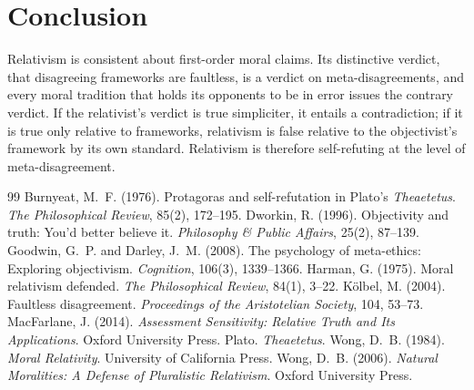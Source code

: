 \documentclass{situationist-preprint}
\begin{document}
\section{Conclusion}

Relativism is consistent about first-order moral claims. Its distinctive verdict, that disagreeing frameworks are faultless, is a verdict on meta-disagreements, and every moral tradition that holds its opponents to be in error issues the contrary verdict. If the relativist's verdict is true simpliciter, it entails a contradiction; if it is true only relative to frameworks, relativism is false relative to the objectivist's framework by its own standard. Relativism is therefore self-refuting at the level of meta-disagreement.

\begin{thebibliography}{99}\small
{} Burnyeat, M.~F. (1976). Protagoras and self-refutation in Plato's \emph{Theaetetus}. \emph{The Philosophical Review}, 85(2), 172--195.
 Dworkin, R. (1996). Objectivity and truth: You'd better believe it. \emph{Philosophy \& Public Affairs}, 25(2), 87--139.
 Goodwin, G.~P. and Darley, J.~M. (2008). The psychology of meta-ethics: Exploring objectivism. \emph{Cognition}, 106(3), 1339--1366.
 Harman, G. (1975). Moral relativism defended. \emph{The Philosophical Review}, 84(1), 3--22.
 K\"olbel, M. (2004). Faultless disagreement. \emph{Proceedings of the Aristotelian Society}, 104, 53--73.
 MacFarlane, J. (2014). \emph{Assessment Sensitivity: Relative Truth and Its Applications}. Oxford University Press.
 Plato. \emph{Theaetetus}.
 Wong, D.~B. (1984). \emph{Moral Relativity}. University of California Press.
 Wong, D.~B. (2006). \emph{Natural Moralities: A Defense of Pluralistic Relativism}. Oxford University Press.
\end{thebibliography}
\end{document}

